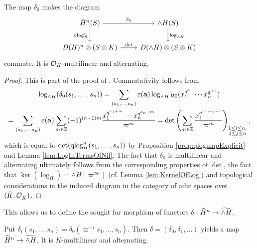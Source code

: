 \documentclass[../main.tex]{subfiles}
\begin{document}
\begin{prop}
  The map $\delta_0$ makes the diagram 
  \begin{equation*}
    \begin{tikzcd}[ampersand replacement=\&]
    	{\tilde H^n(S)} \& {\wedge H(S)} \\
    	{D(H)^n \otimes (S \otimes K)} \& {D(\wedge H) \otimes(S \otimes K)}
    	\arrow["{\delta_0}", from=1-1, to=1-2]
    	\arrow["{\qlog_H^n}"', from=1-1, to=2-1]
    	\arrow["{\log_{\wedge H}}", from=1-2, to=2-2]
    	\arrow["\det", from=2-1, to=2-2]
    \end{tikzcd}
  \end{equation*}
  commute. It is $\cO_K$-multilinear and alternating.
\begin{proof}
  This is part of the proof of \cite[Theorem
  2.10.3]{BoyarchenkoWeinstein2011MaxVar}.
  Commutativity follows from 
  \begin{multline*}
    \log_{\wedge H}(\delta_0(s_1, \dots, s_n)) = \sum_{(a_1, \dots, a_n)} 
    \varepsilon(\mathbf a) \log_{\wedge H} \mu_0( x_1^{q^{a_1}}\cdots x_n^{q^{a_n}})
     \\ = \sum_{(a_1, \dots, a_n)} \varepsilon(\mathbf a) \sum_{m \in \Z} (-1)^{(n-1)m}
    \frac{x_1^{q^{a_1+m}} \cdots x_n^{q^{a_n+m}}}{\varpi^m} 
    = \det \left( \sum_{m \in \Z} \frac{x_i^{q^{mn + j-1}}}{\varpi^m} \right)_{\substack{
      1 \leq i \leq n,\\
      1 \leq j \leq n}},
  \end{multline*}
  which is equal to $\det(\qlog_H^n(s_1, \dots, s_n))$ by Proposition 
  \ref{prop:qlogmapExplicit} and Lemma \ref{lem:LogInTermsOfNil}. 
  The fact that $\delta_0$ is multilinear and alternating ultimately follows
  from the corresponding properties of $\det$, the fact that $\ker(\log_H) =
  \wedge H[\varpi^\infty]$ (cf. Lemma \ref{lem:KernelOfLog}) and topological considerations
  in the induced diagram in the category of adic spaces over $(\breve K, \cO_{\breve K})$.
\end{proof}
\end{prop}

This allows us to define the sought for morphism of functors
$\delta: \Tilde H^n \to \Tilde {\wedge H}$. 
\begin{defi}\label{def:DeltaMap}
  Put $\delta_i(s_1, \dots, s_n) = \delta_0(\varpi^{-i} s_1, \dots, s_n)$. Then 
  $\delta = (\delta_0, \delta_1, \dots)$ yields a map 
  $\Tilde H^n \to \Tilde{\wedge H}$. It is $K$-multilinear and alternating.
\end{defi}
\end{document}
